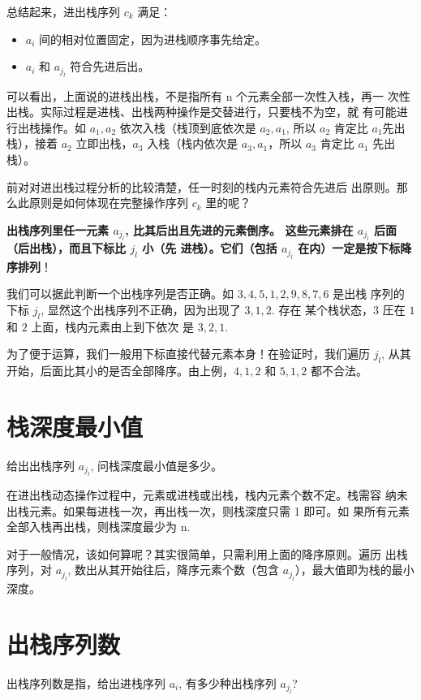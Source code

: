 总结起来，进出栈序列 $c_k$ 满足：
\begin{itemize}
\item $a_i$ 间的相对位置固定，因为进栈顺序事先给定。
\item $a_i$ 和 $a_{j_l}$ 符合先进后出。
\end{itemize}

可以看出，上面说的进栈出栈，不是指所有 n 个元素全部一次性入栈，再一
次性出栈。实际过程是进栈、出栈两种操作是交替进行，只要栈不为空，就
有可能进行出栈操作。如 $a_1, a_2$ 依次入栈（栈顶到底依次是 $a_2,
a_1$, 所以 $a_2$ 肯定比 $a_1$先出栈），接着 $a_2$ 立即出栈，$a_3$
入栈（栈内依次是 $a_3, a_1$，所以 $a_3$ 肯定比 $a_1$ 先出栈）。

前对对进出栈过程分析的比较清楚，任一时刻的栈内元素符合先进后
出原则。那么此原则是如何体现在完整操作序列 $c_k$ 里的呢？

\textbf{出栈序列里任一元素 $a_{j_l}$, 比其后出且先进的元素倒序。
  这些元素排在 $a_{j_l}$ 后面（后出栈），而且下标比 ${j_l}$ 小（先
  进栈）。它们（包括 $a_{j_l}$ 在内）一定是按下标降序排列}！

我们可以据此判断一个出栈序列是否正确。如 $3,4,5,1,2,9,8,7,6$ 是出栈
序列的下标 $j_l$, 显然这个出栈序列不正确，因为出现了 $3,1,2$. 存在
某个栈状态，$3$ 圧在 $1$ 和 $2$ 上面，栈内元素由上到下依次
是 $3,2,1$.

为了便于运算，我们一般用下标直接代替元素本身！在验证时，我们遍历
$j_l$, 从其开始，后面比其小的是否全部降序。由上例，$4,1,2$ 和
$5,1,2$ 都不合法。

\section{栈深度最小值}

给出出栈序列 $a_{j_l}$, 问栈深度最小值是多少。

在进出栈动态操作过程中，元素或进栈或出栈，栈内元素个数不定。栈需容
纳未出栈元素。如果每进栈一次，再出栈一次，则栈深度只需 1 即可。如
果所有元素全部入栈再出栈，则栈深度最少为 n.

对于一般情况，该如何算呢？其实很简单，只需利用上面的降序原则。遍历
出栈序列，对 $a_{j_l}$, 数出从其开始往后，降序元素个数（包含
$a_{j_l}$），最大值即为栈的最小深度。

\section{出栈序列数}

出栈序列数是指，给出进栈序列 $a_i$, 有多少种出栈序列 $a_{j_l}$?

